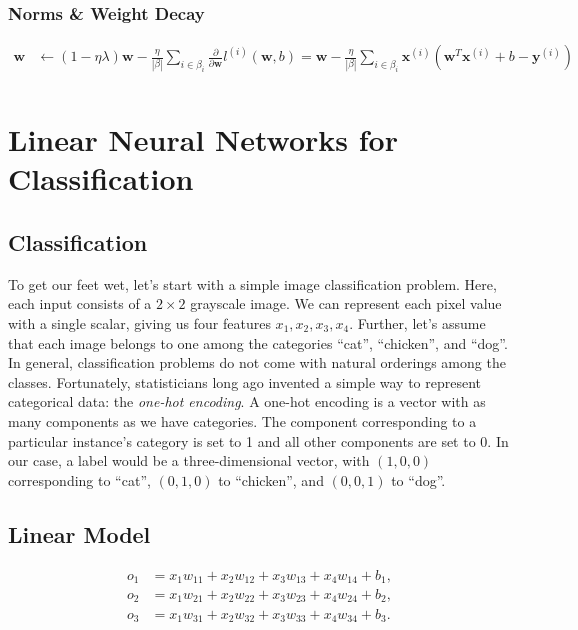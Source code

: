 \documentclass[a4paper,12pt]{article}
\theoremstyle{definition}
\begin{document}
\subsubsection*{Norms \& Weight Decay}
\begin{equation*}
    \begin{aligned}
        \mathbf{w} & \leftarrow (1-\eta\lambda)\mathbf{w} - \frac{\eta}{|\beta|}\sum_{i\in\beta_i}\frac{\partial}{\partial\mathbf{w}}l^{(i)}(\mathbf{w},b) = \mathbf{w}- \frac{\eta}{|\beta|}\sum_{i\in\beta_i}\mathbf{x}^{(i)}(\mathbf{w}^T\mathbf{x}^{(i)} + b - \mathbf{y}^{(i)}) \\
    \end{aligned}
\end{equation*}

\section{Linear Neural Networks for Classification}

\subsection*{Classification}
To get our feet wet, let's start with a simple image classification problem. Here, each input consists of a $2\times2$
grayscale image. We can represent each pixel value with a single scalar, giving us four features $x_1, x_2, x_3, x_4$.
Further, let's assume that each image belongs to one among the categories “cat”, “chicken”, and “dog”.
\newline
In general, classification problems do not come with natural orderings among the classes. Fortunately, statisticians long ago invented a
simple way to represent categorical data: the \emph{one-hot encoding}. A one-hot encoding is a vector with as many components as we have
categories. The component corresponding to a particular instance’s category is set to 1 and all other components are set to 0. In our case,
a label would be a three-dimensional vector, with $(1,0,0)$ corresponding to “cat”, $(0,1,0)$ to “chicken”, and $(0,0,1)$ to “dog”.
\subsection*{Linear Model}
\begin{equation*}
    \begin{aligned}
        o_1 & = x_1 w_{11} + x_2 w_{12} + x_3 w_{13} + x_4 w_{14} + b_1, \\
        o_2 & = x_1 w_{21} + x_2 w_{22} + x_3 w_{23} + x_4 w_{24} + b_2, \\
        o_3 & = x_1 w_{31} + x_2 w_{32} + x_3 w_{33} + x_4 w_{34} + b_3.
    \end{aligned}
\end{equation*}
\end{document}
